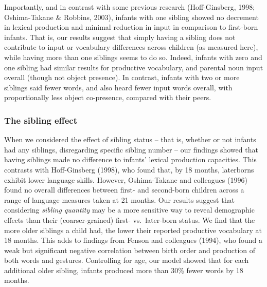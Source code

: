 \documentclass[
  english,
  man,floatsintext]{apa6}
\begin{document}
Importantly, and in contrast with some previous research (Hoff-Ginsberg, 1998; Oshima-Takane \& Robbins, 2003), infants with one sibling showed no decrement in lexical production and minimal reduction in input in comparison to first-born infants. That is, our results suggest that simply having a sibling does not contribute to input or vocabulary differences across children (as measured here), while having more than one siblings seems to do so. Indeed, infants with zero and one sibling had similar results for productive vocabulary, and parental noun input overall (though not object presence). In contrast, infants with two or more siblings said fewer words, and also heard fewer input words overall, with proportionally less object co-presence, compared with their peers.

\hypertarget{the-sibling-effect}{%
\subsubsection{The sibling effect}\label{the-sibling-effect}}

When we considered the effect of sibling status -- that is, whether or not infants had any siblings, disregarding specific sibling number -- our findings showed that having siblings made no difference to infants' lexical production capacities. This contrasts with Hoff-Ginsberg (1998), who found that, by 18 months, laterborns exhibit lower language skills. However, Oshima-Takane and colleagues (1996) found no overall differences between first- and second-born children across a range of language measures taken at 21 months. Our results suggest that considering \emph{sibling quantity} may be a more sensitive way to reveal demographic effects than their (coarser-grained) first- vs.~later-born status. We find that the more older siblings a child had, the lower their reported productive vocabulary at 18 months. This adds to findings from Fenson and colleagues (1994), who found a weak but significant negative correlation between birth order and production of both words and gestures. Controlling for age, our model showed that for each additional older sibling, infants produced more than 30\% fewer words by 18 months.
\end{document}

